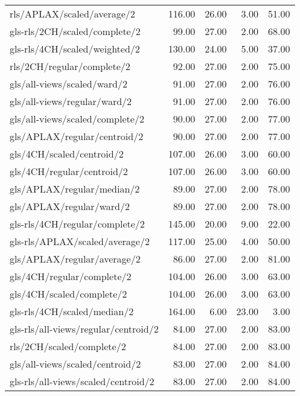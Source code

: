\begin{longtable}{lrrrr}
    rls/APLAX/scaled/average/2                & 116.00 & 26.00 &  3.00 & 51.00 \\
    gls-rls/2CH/scaled/complete/2             &  99.00 & 27.00 &  2.00 & 68.00 \\
    gls-rls/4CH/scaled/weighted/2             & 130.00 & 24.00 &  5.00 & 37.00 \\
    rls/2CH/regular/complete/2                &  92.00 & 27.00 &  2.00 & 75.00 \\
    gls/all-views/scaled/ward/2               &  91.00 & 27.00 &  2.00 & 76.00 \\
    gls/all-views/regular/ward/2              &  91.00 & 27.00 &  2.00 & 76.00 \\
    gls/all-views/scaled/complete/2           &  90.00 & 27.00 &  2.00 & 77.00 \\
    gls/APLAX/regular/centroid/2              &  90.00 & 27.00 &  2.00 & 77.00 \\
    gls/4CH/scaled/centroid/2                 & 107.00 & 26.00 &  3.00 & 60.00 \\
    gls/4CH/regular/centroid/2                & 107.00 & 26.00 &  3.00 & 60.00 \\
    gls/APLAX/regular/median/2                &  89.00 & 27.00 &  2.00 & 78.00 \\
    gls/APLAX/regular/ward/2                  &  89.00 & 27.00 &  2.00 & 78.00 \\
    gls-rls/4CH/regular/complete/2            & 145.00 & 20.00 &  9.00 & 22.00 \\
    gls-rls/APLAX/scaled/average/2            & 117.00 & 25.00 &  4.00 & 50.00 \\
    gls/APLAX/regular/average/2               &  86.00 & 27.00 &  2.00 & 81.00 \\
    gls/4CH/regular/complete/2                & 104.00 & 26.00 &  3.00 & 63.00 \\
    gls/4CH/scaled/complete/2                 & 104.00 & 26.00 &  3.00 & 63.00 \\
    gls-rls/4CH/scaled/median/2               & 164.00 &  6.00 & 23.00 &  3.00 \\
    gls-rls/all-views/regular/centroid/2      &  84.00 & 27.00 &  2.00 & 83.00 \\
    rls/2CH/scaled/complete/2                 &  84.00 & 27.00 &  2.00 & 83.00 \\
    gls/all-views/scaled/centroid/2           &  83.00 & 27.00 &  2.00 & 84.00 \\
    gls-rls/all-views/scaled/centroid/2       &  83.00 & 27.00 &  2.00 & 84.00 \\

\end{longtable}
